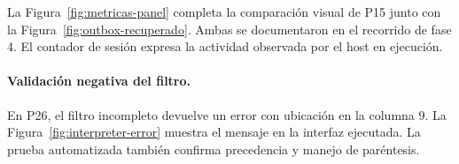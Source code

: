 \clearpage
La Figura~\ref{fig:metricas-panel} completa la comparación visual de P15 junto con la Figura~\ref{fig:outbox-recuperado}. Ambas se documentaron en el recorrido de fase 4. El contador de sesión expresa la actividad observada por el host en ejecución.

\clearpage
\paragraph{Validación negativa del filtro.}
En P26, el filtro incompleto  devuelve un error con ubicación en la columna 9. La Figura~\ref{fig:interpreter-error} muestra el mensaje en la interfaz ejecutada. La prueba automatizada también confirma precedencia y manejo de paréntesis.

